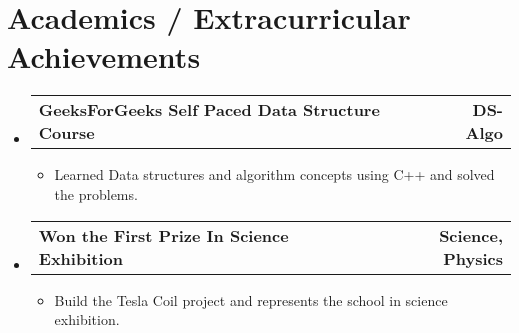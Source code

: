 \documentclass[letterpaper,11pt]{article}
\makeatletter
\newcommand{\resumeItem}[1]{
  \item\small{
    {#1 \vspace{-2pt}}
  }
}
\newcommand{\resumeProjectHeading}[2]{
    \item
    \begin{tabular*}{1.001\textwidth}{l@{\extracolsep{\fill}}r}
      \small#1 & \textbf{\small #2}\\
    \end{tabular*}\vspace{-7pt}
}
\newcommand{\resumeSubHeadingListStart}{\begin{itemize}[leftmargin=0.0in, label={}]}
\newcommand{\resumeSubHeadingListEnd}{\end{itemize}}
\newcommand{\resumeItemListStart}{\begin{itemize}}
\newcommand{\resumeItemListEnd}{\end{itemize}\vspace{-5pt}}
\makeatother
\begin{document}
\section{Academics / Extracurricular Achievements}
\vspace{-5pt}
    \resumeSubHeadingListStart
        \resumeProjectHeading
        {\textbf{GeeksForGeeks Self Paced Data Structure Course}\emph{}}{DS-Algo}
            \resumeItemListStart
                \resumeItem{Learned Data structures and algorithm concepts using C++ and solved the problems.}
            \resumeItemListEnd
            \vspace{-20pt}
        \resumeProjectHeading
        {\textbf{Won the First Prize In Science Exhibition}\emph{ }}{Science, Physics}
            \resumeItemListStart
                \resumeItem{Build the Tesla Coil project and represents the school in science exhibition.}
            \resumeItemListEnd
    \resumeSubHeadingListEnd
\end{document}
